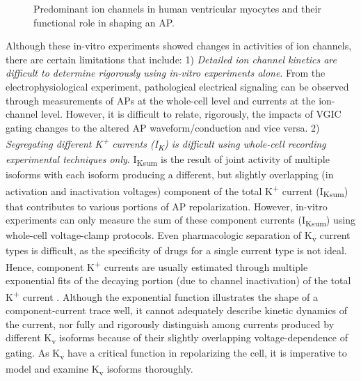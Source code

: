 \documentclass[10pt,letterpaper]{article}
\begin{document}
\begin{figure}[!ht]
    \centering
    \caption{Predominant ion channels in human ventricular myocytes and their functional role in shaping an AP.}
    \label{fig2}
\end{figure}

Although these in-vitro experiments showed changes in activities of ion channels, there are certain limitations that include: 1) \textit{Detailed ion channel kinetics are difficult to determine rigorously using in-vitro experiments alone}. From the electrophysiological experiment, pathological electrical signaling can be observed through measurements of APs at the whole-cell level and currents at the ion-channel level. However, it is difficult to relate, rigorously, the impacts of VGIC gating changes to the altered AP waveform/conduction and vice versa. 2) \textit{Segregating different K\textsuperscript{+} currents (I\textsubscript{K}) is difficult using whole-cell recording experimental techniques only}. I\textsubscript{Ksum} is the result of joint activity of multiple isoforms with each isoform producing a different, but slightly overlapping (in activation and inactivation voltages) component of the total K\textsuperscript{+} current (I\textsubscript{Ksum}) \cite{du2017} that contributes to various portions of AP repolarization. However, in-vitro experiments can only measure the sum of these component currents (I\textsubscript{Ksum}) using whole-cell voltage-clamp protocols. Even pharmacologic separation of K\textsubscript{v} current types is difficult, as the specificity of drugs for a single current type is not ideal. Hence, component K\textsuperscript{+} currents are usually estimated through multiple exponential fits of the decaying portion (due to channel inactivation) of the total K\textsuperscript{+} current \cite{brunet2004heterogeneous}. Although the exponential function illustrates the shape of a component-current trace well, it cannot adequately describe kinetic dynamics of the current, nor fully and rigorously distinguish among currents produced by different K\textsubscript{v} isoforms because of their slightly overlapping voltage-dependence of gating. As K\textsubscript{v} have a critical function in repolarizing the cell, it is imperative to model and examine K\textsubscript{v} isoforms thoroughly.
\end{document}
